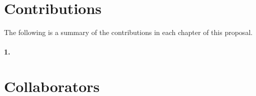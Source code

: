 
\section*{Contributions}
The following is a summary of the contributions in each chapter of this proposal. 

\paragraph*{1.}

\paragraph*{}

\paragraph*{}


\section*{Collaborators}